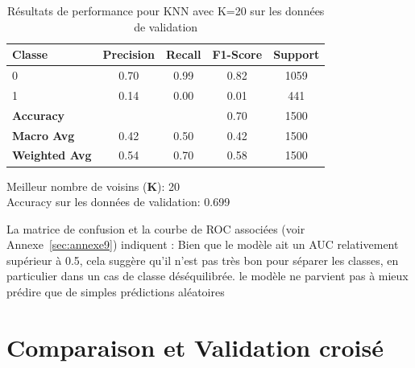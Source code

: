\begin{table}[h]
\centering
\caption{Résultats de performance pour KNN avec K=20 sur les données de validation}
\label{tab:knn_k20_validation}
\begin{tabular}{|l|c|c|c|c|}
\hline
\textbf{Classe}       & \textbf{Precision} & \textbf{Recall} & \textbf{F1-Score} & \textbf{Support} \\ \hline
0                     & 0.70               & 0.99            & 0.82              & 1059             \\ \hline
1                     & 0.14               & 0.00            & 0.01              & 441              \\ \hline
\textbf{Accuracy} & \multicolumn{2}{|c|}{} & 0.70    & 1500     \\ \hline
\textbf{Macro Avg}    & 0.42               & 0.50            & 0.42              & 1500             \\ \hline
\textbf{Weighted Avg} & 0.54               & 0.70            & 0.58              & 1500             \\ \hline
\end{tabular}
\begin{flushleft}
Meilleur nombre de voisins (\textbf{K}): 20 \\
Accuracy sur les données de validation: 0.699
\end{flushleft}
\end{table}


\begin{flushleft}
La matrice de confusion et la courbe de ROC associées (voir Annexe~\ref{sec:annexe9}) indiquent : Bien que le modèle ait un AUC relativement supérieur à 0.5, cela suggère qu'il n'est pas très bon pour séparer les classes, en particulier dans un cas de classe déséquilibrée. 
le modèle ne parvient pas à mieux prédire que de simples prédictions aléatoires
\end{flushleft}

\section{Comparaison et Validation croisé}
